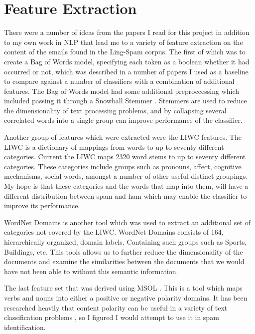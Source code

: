 \documentclass[12pt]{amsart}
\begin{document}
\section{Feature Extraction}

	There were a number of ideas from the papers I read for this project in addition to my own work in NLP that lead me to a variety of feature extraction on the content of the emails found in the Ling-Spam corpus.  The first of which was to create a Bag of Words model, specifying each token as a boolean whether it had occurred or not\cite{pang}, which was described in a number of papers \cite{bayesianfiltering} \cite{phishing} I used as a baseline to compare against a number of classifiers with a combination of additional features.  The Bag of Words model had some additional preproccessing which included passing it through a Snowball Stemmer \cite{snowball}.  Stemmers are used to reduce the dimensionality of text processing problems, and by collapsing several correlated words into a single group can improve performance of the classifier.
	
	Another group of features which were extracted were the LIWC features.  The LIWC is a dictionary of mappings from words to up to seventy different categories. Current the LIWC maps 2320 word stems to up to seventy different categories.  These categories include groups such as pronouns, affect, cognitive mechanisms, social words, amongst a number of other useful distinct groupings. My hope is that these categories and the words that map into them, will have a different distribution between spam and ham which may enable the classifier to improve its performance. 
	
	WordNet Domains is another tool which was used to extract an additional set of categories not covered by the LIWC. WordNet Domains consists of 164, hierarchically organized,\cite{wordnet} domain labels.  Containing such groups such as Sports, Buildings, etc.  This tools allows us to further reduce the dimensionality of the documents and examine the similarities between the documents that we would have not been able to without this semantic information.
	
	The last feature set that was derived using MSOL \cite{msol}.  This is a tool which maps verbs and nouns into either a positive or negative polarity domains.  It has been researched heavily that content polarity can be useful in a variety of text classification problems \cite{sentiment}, so I figured I would attempt to use it in spam identification.
\end{document}
